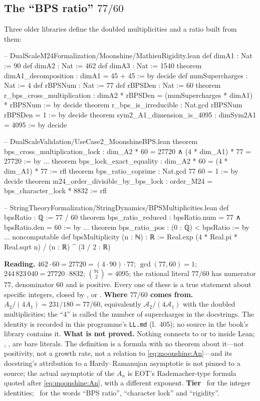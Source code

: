 \subsection{The ``BPS ratio'' \texorpdfstring{$77/60$}{77/60}}
Three older libraries define the doubled multiplicities and a ratio built from them:
\begin{leancode}
-- DualScaleM24Formalization/Moonshine/MathieuRigidity.lean
def dimA1 : Nat := 90
def dimA2 : Nat := 462
def dimA3 : Nat := 1540
theorem dimA1_decomposition : dimA1 = 45 + 45 := by decide
def numSupercharges : Nat := 4
def rBPSNum : Nat := 77
def rBPSDen : Nat := 60
theorem r_bps_cross_multiplication :
    dimA2 * rBPSDen = (numSupercharges * dimA1) * rBPSNum := by decide
theorem r_bps_is_irreducible : Nat.gcd rBPSNum rBPSDen = 1 := by decide
theorem sym2_A1_dimension_is_4095 : dimSym2A1 = 4095 := by decide

-- DualScaleValidation/UseCase2_MoonshineBPS.lean
theorem bps_cross_multiplication_lock :
    dim_A2 * 60 = 27720 ∧ (4 * dim_A1) * 77 = 27720 := by ...
theorem bps_lock_exact_equality : dim_A2 * 60 = (4 * dim_A1) * 77 := rfl
theorem bps_ratio_coprime : Nat.gcd 77 60 = 1 := by decide
theorem m24_order_divisible_by_bps_lock :
    order_M24 = bps_character_lock * 8832 := rfl

-- StringTheoryFormalization/StringDynamics/BPSMultiplicities.lean
def bpsRatio : ℚ := 77 / 60
theorem bps_ratio_reduced : bpsRatio.num = 77 ∧ bpsRatio.den = 60 := by ...
theorem bps_ratio_pos : (0 : ℚ) < bpsRatio := by ...
noncomputable def bpsMultiplicity (n : ℕ) : ℝ :=
  Real.exp (4 * Real.pi * Real.sqrt n) / (n : ℝ) ^ (3 / 2 : ℝ)
\end{leancode}

\begin{leanbox}
\textbf{Reading.} $462\cdot60=27720=(4\cdot90)\cdot77$; $\gcd(77,60)=1$;
$244\,823\,040=27720\cdot8832$; $\binom{91}{2}=4095$; the rational literal $77/60$ has
numerator $77$, denominator $60$ and is positive. Every one of these is a true statement
about specific integers, closed by ,  or .
\textbf{Where $77/60$ comes from.} $A_2/(4A_1)=231/180=77/60$, equivalently
$\mathcal A_2/(4\mathcal A_1)$ with the doubled multiplicities; the ``$4$'' is called the
number of supercharges in the docstrings. The identity is recorded in this programme's
\texttt{LL.md} (l.~405); no source in the book's library contains it.
\textbf{What is not proved.} Nothing connects  to  or to
 inside Lean; , ,  are bare literals.
The definition  is a formula with no theorem about it---not
positivity, not a growth rate, not a relation to \eqref{eq:moonshine:An}---and its
docstring's attribution to a Hardy--Ramanujan asymptotic is not pinned to a source; the
actual asymptotic of the $A_n$ is EOT's Rademacher-type formula quoted after
\eqref{eq:moonshine:An}, with a different exponent. \textbf{Tier} \TA\ for the integer
identities; \TC\ for the words ``BPS ratio'', ``character lock'' and ``rigidity''.
\end{leanbox}

